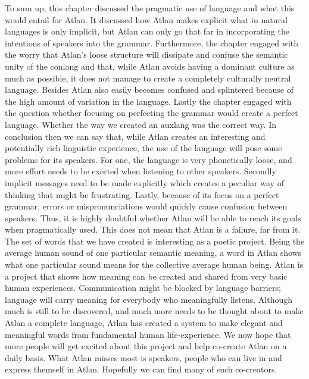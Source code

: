 To sum up, this chapter discussed the pragmatic use of language and what this would entail for Atlan. It discussed how Atlan makes explicit what in natural languages is only implicit, but Atlan can only go that far in incorporating the intentions of speakers into the grammar. Furthermore, the chapter engaged with the worry that Atlan’s loose structure will dissipate and confuse the semantic unity of the conlang and that, while Atlan avoids having a dominant culture as much as possible, it does not manage to create a completely culturally neutral language. Besides Atlan also easily becomes confused and splintered because of the high amount of variation in the language. Lastly the chapter engaged with the question whether focusing on perfecting the grammar would create a perfect language. Whether the way we created an auxlang  was the correct way. In conclusion then we can say that, while Atlan creates an interesting and potentially rich linguistic experience, the use of the language will pose some problems for its speakers. For one, the language is very phonetically loose, and more effort needs to be exerted when listening to other speakers. Secondly implicit messages need to be made explicitly which creates a peculiar way of thinking that might be frustrating. Lastly, because of its focus on a perfect grammar, errors or mispronunciations would quickly cause confusion between speakers. Thus, it is highly doubtful whether Atlan will be able to reach its goals when pragmatically used.  This does not mean that Atlan is  a failure, far from it. The set of words that we have created is interesting as a poetic project. Being the average human sound of one particular semantic meaning, a word in Atlan shows what one particular sound means for the collective average human being. Atlan is a project that shows how meaning can be created and shared from very basic human experiences.  Communication might be blocked by language barriers; language will carry meaning for everybody who meaningfully listens. Although much is still to be discovered, and much more needs to be thought about to make Atlan a complete language, Atlan has created a system to make elegant and meaningful words from fundamental human life-experience. We now hope that more people will get excited about this project and help co-create Atlan on a daily basis. What Atlan misses most is speakers, people who can live in and express themself in Atlan. Hopefully we can find many of such co-creators.

